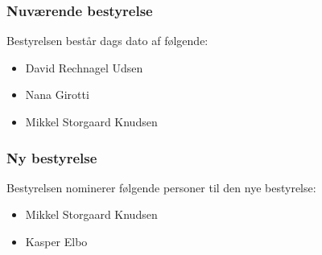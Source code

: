 \documentclass[a4paper,11pt]{report}
\begin{document}
\subsubsection*{Nuværende bestyrelse}

Bestyrelsen består dags dato af følgende:

\begin{itemize}
\item David Rechnagel Udsen
\item Nana Girotti
\item Mikkel Storgaard Knudsen
\end{itemize}

\subsubsection*{Ny bestyrelse}

Bestyrelsen nominerer følgende personer til den nye bestyrelse:

\begin{itemize}
\item Mikkel Storgaard Knudsen
\item Kasper Elbo
\end{itemize}
\end{document}
